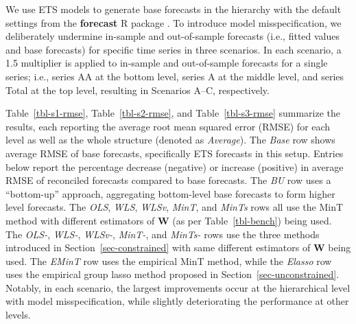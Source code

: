 \documentclass[
  11pt]{article}
\theoremstyle{plain}
\theoremstyle{remark}
\begin{document}
We use ETS models to generate base forecasts in the hierarchy with the
default settings from the \textbf{forecast} R package
\citep{Hyndman2023-fc}. To introduce model misspecification, we
deliberately undermine in-sample and out-of-sample forecasts (i.e.,
fitted values and base forecasts) for specific time series in three
scenarios. In each scenario, a 1.5 multiplier is applied to in-sample
and out-of-sample forecasts for a single series; i.e., series AA at the
bottom level, series A at the middle level, and series Total at the top
level, resulting in Scenarios A--C, respectively.

Table~\ref{tbl-s1-rmse}, Table~\ref{tbl-s2-rmse}, and
Table~\ref{tbl-s3-rmse} summarize the results, each reporting the
average root mean squared error (RMSE) for each level as well as the
whole structure (denoted as \emph{Average}). The \emph{Base} row shows
average RMSE of base forecasts, specifically ETS forecasts in this
setup. Entries below report the percentage decrease (negative) or
increase (positive) in average RMSE of reconciled forecasts compared to
base forecasts. The \emph{BU} row uses a ``bottom-up'' approach,
aggregating bottom-level base forecasts to form higher level forecasts.
The \emph{OLS}, \emph{WLS}, \emph{WLSv}, \emph{MinT}, and \emph{MinTs}
rows all use the MinT method with different estimators of \(\bm{W}\) (as
per Table~\ref{tbl-bench}) being used. The \emph{OLS-}, \emph{WLS-},
\emph{WLSv-}, \emph{MinT-}, and \emph{MinTs-} rows use the three methods
introduced in Section~\ref{sec-constrained} with same different
estimators of \(\bm{W}\) being used. The \emph{EMinT} row uses the
empirical MinT method, while the \emph{Elasso} row uses the empirical
group lasso method proposed in Section~\ref{sec-unconstrained}. Notably,
in each scenario, the largest improvements occur at the hierarchical
level with model misspecification, while slightly deteriorating the
performance at other levels.
\end{document}
